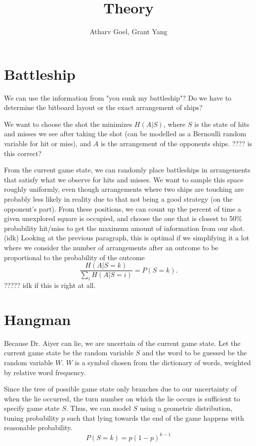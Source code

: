 



    \title{Theory}
    \author{Atharv Goel, Grant Yang}
    \maketitle

    \section{Battleship}

    We can use the information from "you sunk my battleship"? Do we have to determine the bitboard layout or the exact arrangement of ships?

    We want to choose the shot the minimizes $H(A | S)$, where $S$ is the state of hits and misses we see after taking the shot (can be modelled as a Bernoulli random variable for hit or miss), and $A$ is the arrangement of the opponents ships. ???? is this correct?

    From the current game state, we can randomly place battleships in arrangements that satisfy what we observe for hits and misses. We want to sample this space roughly uniformly, even though arrangements where two ships are touching are probably less likely in reality due to that not being a good strategy (on the opponent's part). From these positions, we can count up the percent of time a given unexplored square is occupied, and choose the one that is closest to 50\% probability hit/miss to get the maximum amount of information from our shot. (idk) Looking at the previous paragraph, this is optimal if we simplifying it a lot where we consider the number of arrangements after an outcome to be proportional to the probability of the outcome \[\frac{H(A | S = k)}{\sum_i H(A | S = i)} = P(S=k).\] ????? idk if this is right at all. 

    \newpage

    \section{Hangman}

    Because Dr. Aiyer can lie, we are uncertain of the current game state. Let the current game state be the random variable $S$ and the word to be guessed be the random variable $W$. $W$ is a symbol chosen from the dictionary of words, weighted by relative word frequency. 
    
    Since the tree of possible game state only branches due to our uncertainty of when the lie occurred, the turn number on which the lie occurs is sufficient to specify game state $S$. Thus, we can model $S$ using a geometric distribution, tuning probability $p$ such that lying towards the end of the game happens with reasonable probability.
    \[ P(S = k) = p (1-p)^{k-1}\]

